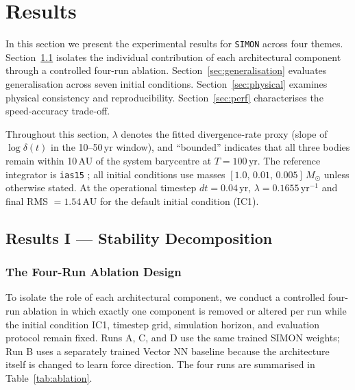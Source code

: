 \documentclass[12pt]{article}
\begin{document}
\section{Results}
\label{sec:results}

In this section we present the experimental results for \texttt{SIMON} across four
themes. Section~\ref{sec:stability} isolates the individual contribution of each
architectural component through a controlled four-run ablation. Section~\ref{sec:generalisation}
evaluates generalisation across seven initial conditions. Section~\ref{sec:physical}
examines physical consistency and reproducibility. Section~\ref{sec:perf} characterises
the speed-accuracy trade-off.

Throughout this section, $\lambda$ denotes the fitted divergence-rate proxy (slope of
$\log\delta(t)$ in the 10--50\,yr window), and ``bounded'' indicates that all three
bodies remain within 10\,AU of the system barycentre at $T = 100$\,yr. The reference
integrator is \texttt{ias15} \citep{Rein_2014}; all initial conditions use masses
$[1.0,\,0.01,\,0.005]\,M_\odot$ unless otherwise stated. At the operational timestep
$dt = 0.04$\,yr, $\lambda = 0.1655$\,yr$^{-1}$ and final RMS $= 1.54$\,AU for the
default initial condition (IC1).

\subsection{Results I --- Stability Decomposition}
\label{sec:stability}

\subsubsection{The Four-Run Ablation Design}

To isolate the role of each architectural component, we conduct a controlled four-run
ablation in which exactly one component is removed or altered per run while the initial
condition IC1, timestep grid, simulation horizon, and evaluation protocol remain fixed. Runs
A, C, and D use the same trained SIMON weights; Run B uses a separately trained
Vector NN baseline because the architecture itself is changed to learn force direction.
The four runs are summarised in
Table~\ref{tab:ablation}.
\end{document}
